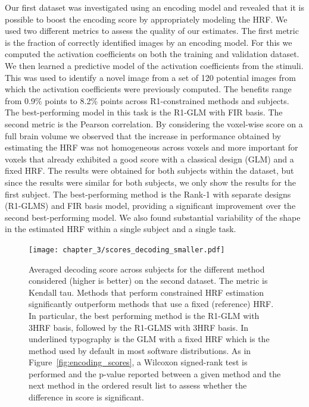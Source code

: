 Our first dataset was investigated using an encoding model and
revealed that it is possible to boost the encoding score
by appropriately modeling the HRF. We used two different metrics to assess the quality of our estimates. The first metric is the fraction of correctly identified images by an encoding model. For this we computed the activation coefficients on both the training and validation dataset. We then learned a predictive model of the activation coefficients from the stimuli. This was used to identify a novel image from a set of 120 potential images from which the activation coefficients were previously computed. The benefits range from 0.9\% points to 8.2\% points across R1-constrained methods and subjects. The best-performing model in this task is the R1-GLM with FIR basis. The second metric is the Pearson correlation.
By considering the voxel-wise score on a
full brain volume we observed that the increase in performance obtained by
estimating the HRF was not homogeneous across voxels and more important for
voxels that already exhibited a good score with a classical design (GLM) and a
fixed HRF. The results were obtained for both subjects within the dataset, but since the results were similar for both subjects, we only show the results for the first subject. The best-performing method is the Rank-1 with separate designs
(R1-GLMS) and FIR basis model, providing a significant improvement over the
second best-performing model. We also found substantial variability of
the shape in the estimated HRF within a single subject and a single task. 

\begin{figure}[t]
\centering
\texttt{[image: chapter\_3/scores\_decoding\_smaller.pdf]}
\caption{\label{fig:decoding_scores}
Averaged decoding score across subjects for the different method considered 
(higher is better) on the second dataset. The metric is Kendall tau. Methods that perform constrained HRF estimation significantly outperform 
methods that use a fixed (reference) HRF. In particular,
the best performing method is the R1-GLM with 3HRF basis, followed by the R1-GLMS with 3HRF basis. 
In underlined typography is the GLM with a fixed HRF which is the method
used by default in most software distributions.
As in Figure~\ref{fig:encoding_scores}, a Wilcoxon signed-rank test is performed and the p-value reported between a given method and the next method in the ordered result list
to assess whether the difference in score is significant.
}
\end{figure}


